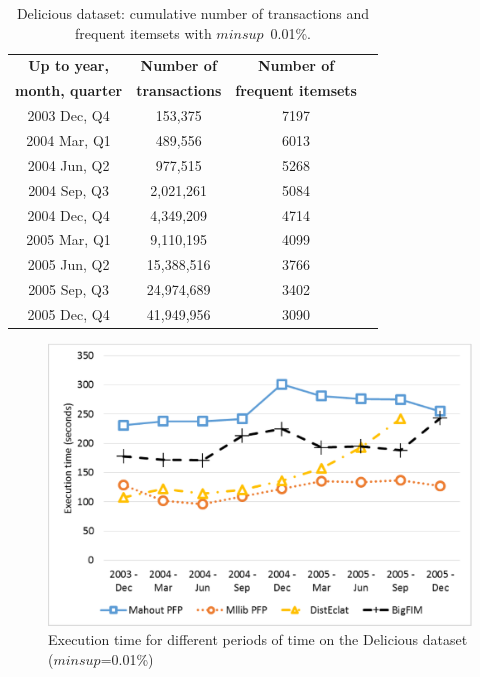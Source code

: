 \begin{table}[h]
\scriptsize
\begin{center}
\caption{Delicious dataset: cumulative number of transactions and frequent itemsets
with $minsup$~0.01\%.}
\label{delicious_itemsets}
\begin{tabular}{|c|c|c|c|}
\hline
{\bf Up to year,}	& {\bf Number of} 	& {\bf	Number of} \\
{\bf month, quarter}	& {\bf transactions} 	& {\bf	frequent itemsets} \\
\hline \hline
2003 Dec, Q4 	& 153,375	 	& 7197 \\ \hline
2004 Mar, Q1  	& 489,556		& 6013 \\ \hline
2004 Jun, Q2	& 977,515		& 5268 \\ \hline
2004 Sep, Q3 	& 2,021,261		& 5084 \\ \hline
2004 Dec, Q4 	& 4,349,209		& 4714 \\ \hline
2005 Mar, Q1	& 9,110,195		& 4099 \\ \hline
2005 Jun, Q2	& 15,388,516		& 3766 \\ \hline
2005 Sep, Q3	& 24,974,689		& 3402 \\ \hline
2005 Dec, Q4	& 41,949,956		& 3090 \\ \hline
\end{tabular}
\end{center}
\end{table}

\begin{figure}[!t]
\includegraphics[width=5in]{delicious.eps}
\caption{Execution time for different periods of time on the Delicious dataset
($minsup$=0.01\%)}
\label{delicious}
\end{figure}


